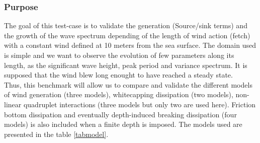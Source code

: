 \subsubsection{Purpose}
The goal of this test-case is to validate the generation (Source/sink terms)  and the growth of the wave spectrum depending of the length of wind action (fetch) with a constant wind defined at 10 meters from the sea surface. The domain used is simple and we want to observe the evolution of few parameters along its length, as the significant wave height, peak period and variance spectrum.
It is supposed that the wind blew long enought to have reached a steady state.\\
Thus, this benchmark will allow us to compare and validate the different models of wind generation (three models), whitecapping dissipation (two models), non-linear quadruplet interactions (three models but only two are used here). Friction bottom dissipation and eventually depth-induced breaking dissipation (four models) is also included when a finite depth is imposed. The models used are presented in the table \ref{tabmodel}.
